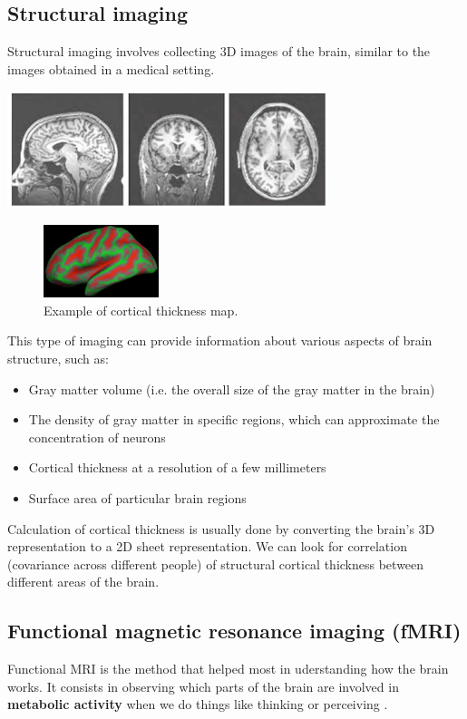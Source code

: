 \subsection{Structural imaging}
Structural imaging involves collecting 3D images of the brain, similar to the images obtained in a medical setting.

\begin{center}
\includegraphics[width=0.7\textwidth]{images/structural_imaging.png}
\end{center}

\begin{figure}
  \centering \includegraphics[width=0.3\textwidth]{images/thickness.png}
  \caption*{Example of cortical thickness map.}
\end{figure}
This type of imaging can provide information about various aspects of brain 
structure, such as:

\begin{itemize}
    \item Gray matter volume (i.e. the overall size of the gray matter in the brain)
    \item The density of gray matter in specific regions, which can approximate the concentration of neurons
    \item Cortical thickness at a resolution of a few millimeters
    \item Surface area of particular brain regions
\end{itemize}

Calculation of cortical thickness is usually done by converting the brain's 3D representation to a 2D sheet representation.
We can look for correlation (covariance across different people) of structural cortical thickness between different areas of the brain.

\subsection{Functional  magnetic resonance imaging (fMRI)}
Functional MRI is the method that helped most in uderstanding how the brain works. It consists in observing which parts of the brain are involved in \textbf{metabolic activity} when we do things like thinking or perceiving \notet.

